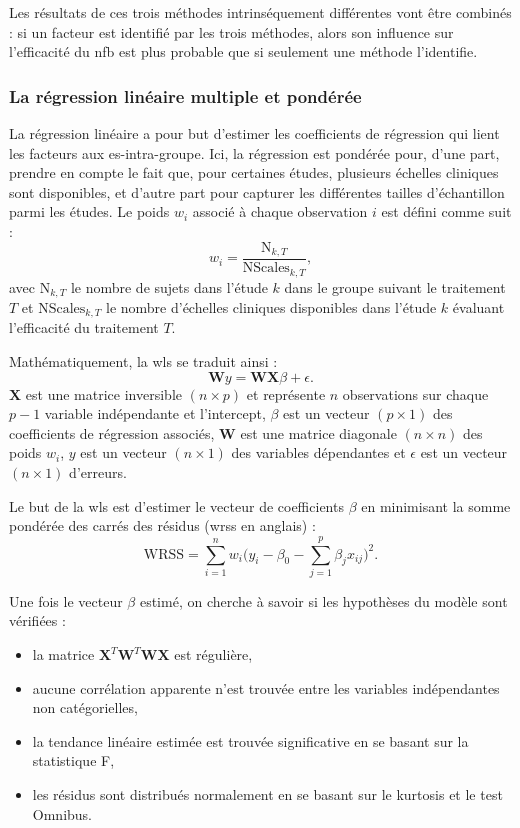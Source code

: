 Les résultats de ces trois méthodes intrinséquement différentes vont être combinés : si un facteur est identifié par les trois méthodes, alors son influence sur l'efficacité du 
\gls{nfb} est plus probable que si seulement une méthode l'identifie. 

\subsubsection{La régression linéaire multiple et pondérée}
La régression linéaire a pour but d'estimer les coefficients de régression qui lient les facteurs aux \gls{es}-intra-groupe. Ici, la régression est pondérée pour, d'une part, 
prendre en compte le fait que, pour certaines études, plusieurs échelles cliniques sont disponibles, et d'autre part pour capturer les différentes tailles d'échantillon parmi les études.
Le poids $w_{i}$ associé à chaque observation $i$ est défini comme suit : 
\begin{equation}
\label{eq:weight_WLS}
w_{i} = \frac{\text{N}_{k,T}}{\text{NScales}_{k,T}},
\end{equation} 
avec $\text{N}_{k,T}$ le nombre de sujets dans l'étude $k$ dans le groupe suivant le traitement $T$ et $\text{NScales}_{k,T}$ le nombre 
d'échelles cliniques disponibles dans l'étude $k$ évaluant l'efficacité du traitement $T$.

Mathématiquement, la \gls{wls} se traduit ainsi : 
\begin{equation}
\label{eq:factors_model_WLS}
\textbf{W}y = \textbf{WX}\beta + \epsilon.
\end{equation}
$\textbf{X}$ est une matrice inversible $(n \times p)$ et représente $n$ observations sur chaque $p-1$ variable indépendante et l'intercept, 
$\beta$ est un vecteur $(p \times 1)$ des coefficients de régression associés, $\textbf{W}$ est une matrice diagonale $(n \times n)$  
des poids $w_{i}$, $y$ est un vecteur $(n \times 1)$ des variables dépendantes et $\epsilon$ est un vecteur $(n \times 1)$ d'erreurs.

Le but de la \gls{wls} est d'estimer le vecteur de coefficients $\beta$ en minimisant la somme pondérée des carrés des résidus (\gls{wrss} en anglais) :
\begin{equation}
\label{eq:factors_WRSS}
\text{WRSS} = \sum_{i=1}^{n} w_i \Big(y_i - \beta_{0} - \sum_{j=1}^{p}\beta_{j}x_{ij}\Big)^2.
\end{equation}

Une fois le vecteur $\beta$ estimé, on cherche à savoir si les hypothèses du modèle sont vérifiées : 
\begin{itemize}
	\item la matrice ${\textbf{X}}^{T}\textbf{W}^{T}\textbf{WX}$ est régulière,
  \item aucune corrélation apparente n'est trouvée entre les variables indépendantes non catégorielles, 
  \item la tendance linéaire estimée est trouvée significative en se basant sur la statistique F,
  \item les résidus sont distribués normalement en se basant sur le kurtosis et le test Omnibus.
\end{itemize} 

